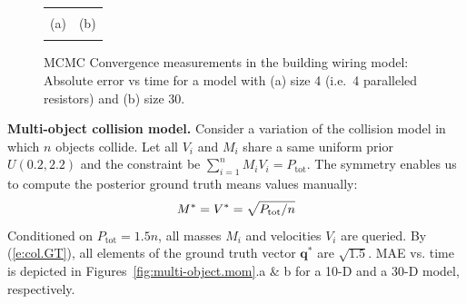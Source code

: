 \documentclass[letterpaper]{article}
\newcommand{\bvec}[1]{\textbf{#1}}
\begin{document}
\begin{figure}[t!]
\begin{center}
\begin{tabular}{cc}
\vspace{-1.5mm}
\\
\hspace{-5mm} \footnotesize(a) 
& \hspace{-4mm} \footnotesize(b) 
\\
\multicolumn{2}{c}{}
\end{tabular}
\end{center}
\vspace{-6mm}
\caption{\footnotesize 
MCMC Convergence measurements in the building wiring model: 
Absolute error vs time for a model with (a) size 4 (i.e.\ 4 paralleled resistors) and (b) size 30.}
\label{fig:resistor}
\vspace{-2mm}
\end{figure}


{\bf Multi-object collision model.}
Consider a variation of the collision model in which $n$ objects collide.  
Let all $V_i$ and $M_i$ share a same uniform prior $U(0.2, 2.2)$ and the constraint be $\sum_{i=1}^n{M_i V_i} = P_{\text{tot}}$. 
The symmetry enables us to compute the posterior ground truth means  values  manually:
\begin{equation}\footnotesize
\label{e:col.GT}
M^* = V^* = \sqrt{P_{\text{tot}} / n} %
\end{equation}
Conditioned on $P_{\text{tot}} = 1.5 n$, all masses $M_i$ and velocities  $V_i$ are queried. 
By (\ref{e:col.GT}), all elements of the ground truth vector $\bvec{q}^*$ are $\sqrt{1.5}$.
%
MAE vs. time is depicted in Figures~\ref{fig:multi-object.mom}.a \& b for a 10-D and a 30-D model, respectively.
\end{document}
